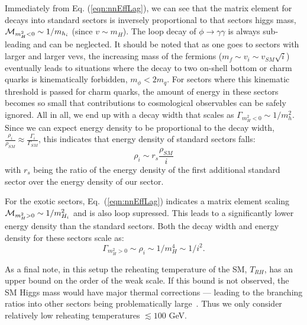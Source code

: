 \documentclass[nofootinbib,twocolumn,preprintnumbers]{revtex4-1}
\begin{document}
Immediately from Eq. (\ref{eqn:nnEffLag}), we can see that the matrix element for decays into standard sectors is inversely proportional to that sectors higgs mass, ${\cal M}_{m_H^2 < 0} \sim 1/m_{h_i}$ (since $v\sim m_H$). 
The loop decay of $\phi \rightarrow \gamma\gamma$ is always sub-leading and can be neglected. It should be noted that as one goes to sectors with larger and larger vevs, the increasing mass of the fermions ($m_f \sim v_i \sim v_{SM}\sqrt{i}$) eventually leads to situations where the decay to two on-shell bottom or charm quarks is kinematically forbidden, $m_\phi < 2 m_q$. For sectors where this kinematic threshold is passed for charm quarks, the amount of energy in these sectors becomes so small that contributions to cosmological observables can be safely ignored. All in all, we end up with a decay width that scales as $\Gamma_{m_H^2<0} \sim 1/m_h^2$. Since we can expect energy density to be proportional to the decay width, $\frac{\rho_i}{\rho_{SM}} \approx \frac{\Gamma_i}{\Gamma_{SM}}$, this indicates that energy density of standard sectors falls:
\begin{equation}\label{eqn:edSS}
\rho_i \sim r_{s}\frac{\rho_{SM}}{i}
\end{equation} 
with $r_s$ being the ratio of the energy density of the first additional standard sector over the energy density of our sector.

For the exotic sectors, Eq.~(\ref{eqn:nnEffLag}) indicates a matrix element scaling ${\cal M}_{m_H^2>0} \sim 1/m_{H_i}^2$ and is also loop supressed. 
This leads to a significantly lower energy density than the standard sectors. Both the decay width and energy density for these sectors scale as: 
\begin{equation}
\Gamma_{m_H^2>0} \sim \rho_i \sim 1/m_H^4 \sim 1/i^2.
\label{eq:reheat_exotic}
\end{equation} 

As a final note, in this setup the reheating temperature of the SM, $T_{RH}$, has an upper bound on the order of the weak scale. If this bound is not observed, the SM Higgs mass would have major thermal corrections --- leading to the branching ratios into other sectors being problematically large~\citep{Arkani-Hamed:2016rle}. Thus we only consider relatively low reheating temperatures $\lesssim 100$ GeV.
\end{document}
